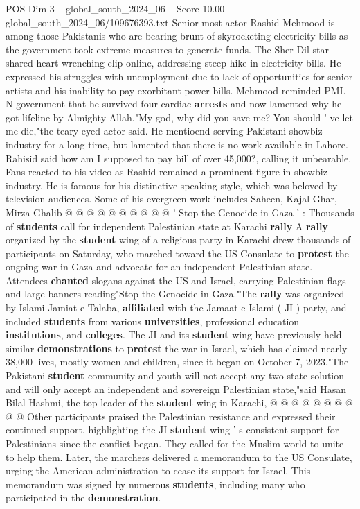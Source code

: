 \begin{textsample}{POS Dim 3 – global\_south\_2024\_06 – Score 10.00 – global\_south\_2024\_06/109676393.txt}  \label{ex:f3_pos_344}
Senior most actor Rashid Mehmood is among those Pakistanis who are bearing brunt of skyrocketing electricity bills as the government took extreme measures to generate funds.
The Sher Dil star shared heart-wrenching clip online, addressing steep hike in electricity bills.
He expressed his struggles with unemployment due to lack of opportunities for senior artists and his inability to pay exorbitant power bills.
Mehmood reminded PML-N government that he survived four cardiac \textbf{arrests} and now lamented why he got lifeline by Almighty Allah."My god, why did you save me?
You should ' ve let me die,"the teary-eyed actor said.
He mentioend serving Pakistani showbiz industry for a long time, but lamented that there is no work available in Lahore.
Rahisid said how am I supposed to pay bill of over 45,000?, calling it unbearable.
Fans reacted to his video as Rashid remained a prominent figure in showbiz industry.
He is famous for his distinctive speaking style, which was beloved by television audiences.
Some of his evergreen work includes Saheen, Kajal Ghar, Mirza Ghalib @ @ @ @ @ @ @ @ @ @ ' Stop the Genocide in Gaza ' : Thousands of \textbf{students} call for independent Palestinian state at Karachi \textbf{rally} A \textbf{rally} organized by the \textbf{student} wing of a religious party in Karachi drew thousands of participants on Saturday, who marched toward the US Consulate to \textbf{protest} the ongoing war in Gaza and advocate for an independent Palestinian state.
Attendees \textbf{chanted} slogans against the US and Israel, carrying Palestinian flags and large banners reading"Stop the Genocide in Gaza."The \textbf{rally} was organized by Islami Jamiat-e-Talaba, \textbf{affiliated} with the Jamaat-e-Islami ( JI ) party, and included \textbf{students} from various \textbf{universities}, professional education \textbf{institutions}, and \textbf{colleges}.
The JI and its \textbf{student} wing have previously held similar \textbf{demonstrations} to \textbf{protest} the war in Israel, which has claimed nearly 38,000 lives, mostly women and children, since it began on October 7, 2023."The Pakistani \textbf{student} community and youth will not accept any two-state solution and will only accept an independent and sovereign Palestinian state,"said Hasan Bilal Hashmi, the top leader of the \textbf{student} wing in Karachi, @ @ @ @ @ @ @ @ @ @ Other participants praised the Palestinian resistance and expressed their continued support, highlighting the JI \textbf{student} wing ' s consistent support for Palestinians since the conflict began.
They called for the Muslim world to unite to help them.
Later, the marchers delivered a memorandum to the US Consulate, urging the American administration to cease its support for Israel.
This memorandum was signed by numerous \textbf{students}, including many who participated in the \textbf{demonstration}.

\end{textsample}
